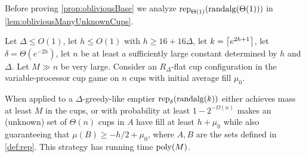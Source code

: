 Before proving \cref{prop:obliviousBase} we analyze
$\operatorname{\text{\textup{rep}}}_{\Theta(1)}(\operatorname{\text{\textup{randalg}}}(\Theta(1)))$ in \cref{lem:obliviousManyUnknownCups}.
\begin{lemma}
  \label{lem:obliviousManyUnknownCups}
  Let $\Delta \le O(1)$, let $h \le O(1)$ with $h \ge
  16+16\Delta$, let $k = \left\lceil e^{2h+1} \right\rceil$, let $\delta =
  \Theta(e^{-2h})$, let $n$ be at least a sufficiently large
  constant determined by $h$ and $\Delta$. Let $M\gg n$ be very
  large. Consider an $R_\Delta$-flat cup configuration in the
  variable-processor cup game on $n$ cups with initial average
  fill $\mu_0$.

  When applied to a $\Delta$-greedy-like emptier
  $\operatorname{\text{\textup{rep}}}_{\delta}(\operatorname{\text{\textup{randalg}}}(k))$ either achieves mass at least $M$ in
  the cups, or with probability at least $1-2^{-\Omega(n)}$ makes an
  (unknown) set of $\Theta(n)$ cups in $A$ have fill at least $h + \mu_0$
  while also guaranteeing that $\mu(B) \ge -h/2 + \mu_0$,
  where $A,B$ are the sets defined in \cref{def:rep}.
  This strategy has running time $\operatorname{\text{poly}}(M)$.
\end{lemma}
